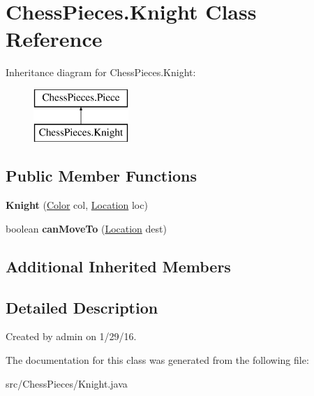 \hypertarget{class_chess_pieces_1_1_knight}{}\section{Chess\+Pieces.\+Knight Class Reference}
\label{class_chess_pieces_1_1_knight}
Inheritance diagram for Chess\+Pieces.\+Knight\+:\begin{figure}[H]
\begin{center}
\leavevmode
\includegraphics[height=2.000000cm]{class_chess_pieces_1_1_knight}
\end{center}
\end{figure}
\subsection*{Public Member Functions}
\begin{DoxyCompactItemize}
\item 
{\bfseries Knight} (\hyperlink{enum_chess_pieces_1_1_color}{Color} col, \hyperlink{class_chess_pieces_1_1_location}{Location} loc)\hypertarget{class_chess_pieces_1_1_knight_a92ce5e4ffdccb4067075c814b95bf223}{}\label{class_chess_pieces_1_1_knight_a92ce5e4ffdccb4067075c814b95bf223}

\item 
boolean {\bfseries can\+Move\+To} (\hyperlink{class_chess_pieces_1_1_location}{Location} dest)\hypertarget{class_chess_pieces_1_1_knight_a74070aa6822b52e0139e7a92ca6566fc}{}\label{class_chess_pieces_1_1_knight_a74070aa6822b52e0139e7a92ca6566fc}

\end{DoxyCompactItemize}
\subsection*{Additional Inherited Members}


\subsection{Detailed Description}
Created by admin on 1/29/16. 

The documentation for this class was generated from the following file\+:\begin{DoxyCompactItemize}
\item 
src/\+Chess\+Pieces/Knight.\+java\end{DoxyCompactItemize}
